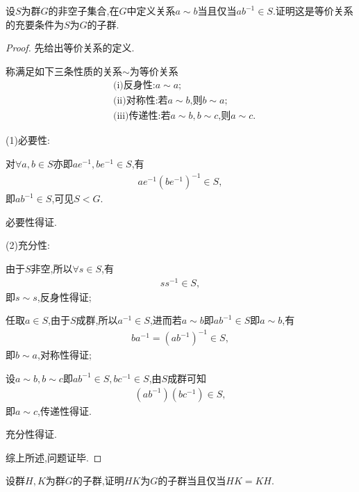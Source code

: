 \begin{problem}[P54T9]
    设$S$为群$G$的非空子集合,在$G$中定义关系$a\sim b$当且仅当$ab^{-1}\in S$.证明这是等价关系的充要条件为$S$为$G$的子群.
\end{problem}
\begin{proof}
    先给出等价关系的定义.
    \begin{definition}[等价关系]\label{djgx}
        称满足如下三条性质的关系$\sim$为等价关系\begin{align*}
            &\text{(i)}\text{反身性:$a\sim a$;}\\
            &\text{(ii)}\text{对称性:若$a\sim b$,则$b\sim a$;}\\
            &\text{(iii)}\text{传递性:若$a\sim b,b\sim c$,则$a\sim c$.}
        \end{align*}
    \end{definition}
    (1)必要性:

    对$\forall a,b\in S$亦即$ae^{-1},be^{-1}\in S$,有\begin{align*}
        ae^{-1}(be^{-1})^{-1}\in S,
    \end{align*}即$ab^{-1}\in S$,可见$S<G$.
    
    必要性得证.

    (2)充分性:

    由于$S$非空,所以$\forall s\in S$,有\begin{align*}
        ss^{-1}\in S,
    \end{align*}即$s\sim s$,反身性得证;

    任取$a\in S$,由于$S$成群,所以$a^{-1}\in S$,进而若$a\sim b$即$ab^{-1}\in S$即$a\sim b$,有\begin{align*}
    ba^{-1}=(ab^{-1})^{-1}\in S,
    \end{align*}即$b\sim a$,对称性得证;

    设$a\sim b,b\sim c$即$ab^{-1}\in S,bc^{-1}\in S$,由$S$成群可知\begin{align*}
    (ab^{-1})(bc^{-1})\in S,
    \end{align*}即$a\sim c$,传递性得证.

    充分性得证.

    综上所述,问题证毕.
\end{proof}
\begin{problem}[P55T20]
    设群$H,K$为群$G$的子群,证明$HK$为$G$的子群当且仅当$HK=KH$.
\end{problem}
